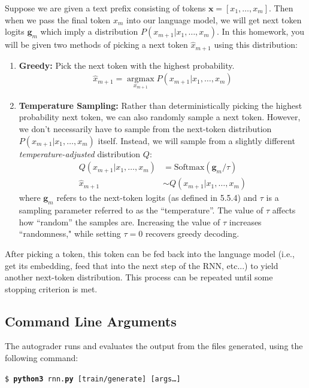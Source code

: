 \documentclass[11pt,addpoints,answers]{exam}
\newcommand{\gv}{\mathbf{g}}
\newcommand{\xv}{\mathbf{x}}
\newcommand \argmax {\operatorname*{argmax}}
\begin{document}
Suppose we are given a text prefix consisting of tokens $\xv = [x_1, \ldots, x_m]$. Then when we pass the final token $x_m$ into our language model, we will get next token logits $\gv_m$ which imply a distribution $P(x_{m+1} | x_1, \ldots, x_m)$. In this homework, you will be given two methods of picking a next token $\hat{x}_{m+1}$ using this distribution:

\begin{enumerate}
    \item \textbf{Greedy:} Pick the next token with the highest probability.
    \begin{align*}
        \hat{x}_{m+1} = \argmax_{x_{m+1}} P(x_{m+1} | x_1, \ldots, x_m)
    \end{align*}
    \item \textbf{Temperature Sampling:} Rather than deterministically picking the highest probability next token, we can also randomly sample a next token. However, we don't necessarily have to sample from the next-token distribution $P(x_{m+1} | x_1, \ldots, x_m)$ itself. Instead, we will sample from a slightly different \emph{temperature-adjusted} distribution $Q$:
    \begin{align*}
        Q(x_{m+1} | x_1, \ldots, x_m) &= \text{Softmax}(\gv_m / \tau) \\
        \hat{x}_{m+1} &\sim Q(x_{m+1} | x_1, \ldots, x_m)
    \end{align*}
    where $\gv_m$ refers to the next-token logits (as defined in 5.5.4) and $\tau$ is a sampling parameter referred to as the ``temperature''. The value of $\tau$ affects how ``random'' the samples are. Increasing the value of $\tau$ increases ``randomness," while setting $\tau = 0$ recovers greedy decoding.
\end{enumerate}
After picking a token, this token can be fed back into the language model (i.e., get its embedding, feed that into the next step of the RNN, etc...) to yield another next-token distribution. This process can be repeated until some stopping criterion is met.



\subsection{Command Line Arguments}\label{command}
The autograder runs and evaluates the output from the files generated, using the following command:

\begin{tabbing}
\=\texttt{\$ \textbf{python3} rnn.\textbf{py} [train/generate] [args\dots]}\\
\end{tabbing}
    
\end{document}
